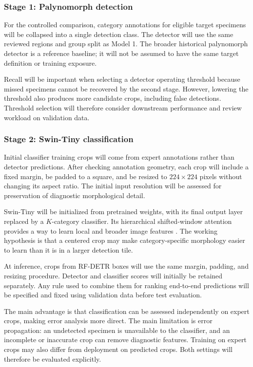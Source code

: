 \documentclass[conference,letterpaper]{IEEEtran}
\begin{document}
\subsubsection{Stage 1: Palynomorph detection}
For the controlled comparison, category annotations for eligible target specimens will be collapsed into a single detection class. The detector will use the same reviewed regions and group split as Model 1. The broader historical palynomorph detector is a reference baseline; it will not be assumed to have the same target definition or training exposure.

Recall will be important when selecting a detector operating threshold because missed specimens cannot be recovered by the second stage. However, lowering the threshold also produces more candidate crops, including false detections. Threshold selection will therefore consider downstream performance and review workload on validation data.

\subsubsection{Stage 2: Swin-Tiny classification}
Initial classifier training crops will come from expert annotations rather than detector predictions. After checking annotation geometry, each crop will include a fixed margin, be padded to a square, and be resized to $224\times224$ pixels without changing its aspect ratio. The initial input resolution will be assessed for preservation of diagnostic morphological detail.

Swin-Tiny will be initialized from pretrained weights, with its final output layer replaced by a $K$-category classifier. Its hierarchical shifted-window attention provides a way to learn local and broader image features \cite{liu2021}. The working hypothesis is that a centered crop may make category-specific morphology easier to learn than it is in a larger detection tile.

At inference, crops from RF-DETR boxes will use the same margin, padding, and resizing procedure. Detector and classifier scores will initially be retained separately. Any rule used to combine them for ranking end-to-end predictions will be specified and fixed using validation data before test evaluation.

The main advantage is that classification can be assessed independently on expert crops, making error analysis more direct. The main limitation is error propagation: an undetected specimen is unavailable to the classifier, and an incomplete or inaccurate crop can remove diagnostic features. Training on expert crops may also differ from deployment on predicted crops. Both settings will therefore be evaluated explicitly.
\end{document}
